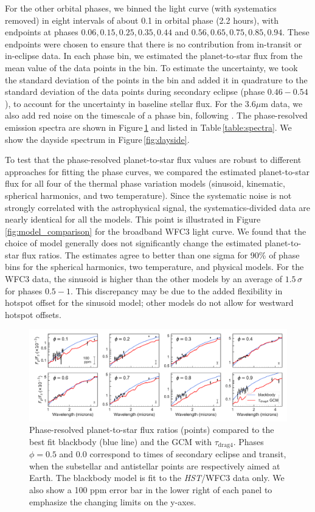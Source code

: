 \documentclass[twocolumn, trackchanges]{aastex61}
\newcommand{\project}[1]{\textsl{#1}}
\newcommand{\HST}{\project{HST}}
\begin{document}
For the other orbital phases, we binned the light curve (with systematics
removed) in eight intervals of about 0.1 in orbital phase (2.2 hours), with endpoints at
phases $0.06, 0.15, 0.25, 0.35, 0.44$ and $0.56, 0.65, 0.75, 0.85, 0.94$. These
endpoints were chosen to ensure that there is no contribution from in-transit or
in-eclipse data.  In each phase bin, we estimated the planet-to-star flux from
the mean value of the data points in the bin. To estimate the uncertainty, we
took the standard deviation of the points in the bin and added it in quadrature
to the standard deviation of the data points during secondary eclipse (phase
$0.46-0.54$), to account for the uncertainty in baseline stellar flux.  For the
$3.6\mu$m data, we also add red noise on the timescale of a phase bin, following
\cite{pont06}.  The phase-resolved emission spectra are shown in
Figure\,\ref{fig:spectra} and listed in Table\,\ref{table:spectra}. We show the
dayside spectrum in Figure\,\ref{fig:dayside}.

To test that the phase-resolved planet-to-star flux values are robust to different approaches for fitting the phase curves, we compared the estimated planet-to-star flux for all four of the thermal phase variation models (sinusoid, kinematic, spherical harmonics, and two temperature).  Since the systematic noise is not strongly correlated with the astrophysical signal, the systematics-divided data are nearly identical for all the models.  This point is illustrated in Figure\,\ref{fig:model_comparison} for the broadband WFC3 light curve.  We found that the choice of model generally does not significantly change the estimated planet-to-star flux ratios.  The estimates agree to better than one sigma for 90\% of phase bins for the spherical harmonics, two temperature, and physical models. For the WFC3 data, the sinusoid is higher than the other models by an average of $1.5\,\sigma$ for phases $0.5 - 1$. This discrepancy may be due to the added flexibility in hotspot offset for the sinusoid model; other models do not allow for westward hotspot offsets.

\begin{figure}
\includegraphics[width = 1.0\textwidth]{fig6.pdf}
\caption{Phase-resolved planet-to-star flux ratios (points) compared to the best fit blackbody (blue line) and the GCM with $\tau_\mathrm{drag4}$. Phases $\phi=0.5$ and $0.0$ correspond to times of secondary eclipse and transit, when the substellar and antistellar points are respectively aimed at Earth. The blackbody model is fit to the \HST/WFC3 data only. We also show a 100 ppm error bar in the lower right of each panel to emphasize the changing limits on the y-axes.}
\label{fig:spectra}
\end{figure}
\end{document}
